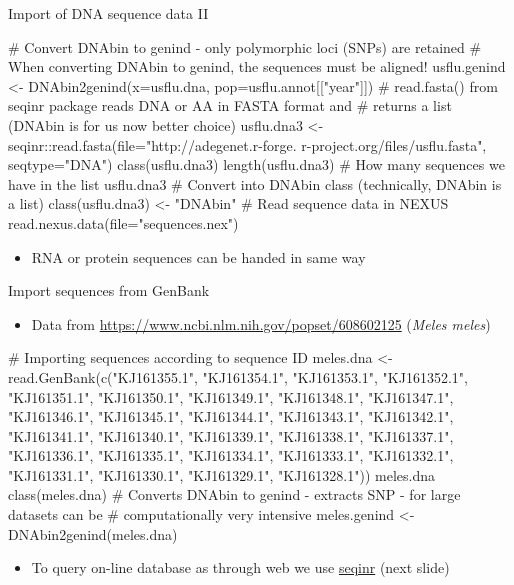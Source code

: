 \documentclass[compress, ucs, xelatex, 11pt, xcolor=svgnames,
  hyperref={
    bookmarks=true,
    unicode=true,
    colorlinks=true,
    pdftitle={Molecular data in R},
    plainpages=false,
    pdfauthor={Vojtech Zeisek},
    pdfsubject={Course about phylogeny and evolution in R},
    pdfcreator={XeLaTeX},
    pdfkeywords={R, evolution, phylogeny, molecular data},
    linkcolor=Tomato,
    anchorcolor=SaddleBrown,
    citecolor=Goldenrod,
    filecolor=DarkMagenta,
    menucolor=Sienna,
    urlcolor=DarkTurquoise,
    pdftex},
  url={hyphens, lowtilde} %
  ]{beamer}
\begin{document}
\begin{frame}[fragile]{Import of DNA sequence data II}
  \begin{spluscode}
    # Convert DNAbin to genind - only polymorphic loci (SNPs) are retained
    # When converting DNAbin to genind, the sequences must be aligned!
    usflu.genind <- DNAbin2genind(x=usflu.dna, pop=usflu.annot[["year"]])
    # read.fasta() from seqinr package reads DNA or AA in FASTA format and
    # returns a list (DNAbin is for us now better choice)
    usflu.dna3 <- seqinr::read.fasta(file="http://adegenet.r-forge.
      r-project.org/files/usflu.fasta", seqtype="DNA")
    class(usflu.dna3)
    length(usflu.dna3) # How many sequences we have in the list
    usflu.dna3
    # Convert into DNAbin class (technically, DNAbin is a list)
    class(usflu.dna3) <- "DNAbin"
    # Read sequence data in NEXUS
    read.nexus.data(file="sequences.nex")
  \end{spluscode}
  \begin{itemize}
    \item RNA or protein sequences can be handed in same way
  \end{itemize}
\end{frame}

\begin{frame}[fragile]{Import sequences from GenBank}
  \begin{itemize}
    \item Data from \url{https://www.ncbi.nlm.nih.gov/popset/608602125} (\textit{Meles meles})
  \end{itemize}
  \begin{spluscode}
    # Importing sequences according to sequence ID
    meles.dna <- read.GenBank(c("KJ161355.1", "KJ161354.1", "KJ161353.1",
      "KJ161352.1", "KJ161351.1", "KJ161350.1", "KJ161349.1", "KJ161348.1",
      "KJ161347.1", "KJ161346.1", "KJ161345.1", "KJ161344.1", "KJ161343.1",
      "KJ161342.1", "KJ161341.1", "KJ161340.1", "KJ161339.1", "KJ161338.1",
      "KJ161337.1", "KJ161336.1", "KJ161335.1", "KJ161334.1", "KJ161333.1",
      "KJ161332.1", "KJ161331.1", "KJ161330.1", "KJ161329.1", "KJ161328.1"))
    meles.dna
    class(meles.dna)
    # Converts DNAbin to genind - extracts SNP - for large datasets can be
    # computationally very intensive
    meles.genind <- DNAbin2genind(meles.dna)
  \end{spluscode}
  \begin{itemize}
    \item To query on-line database as through web we use \href{https://cran.r-project.org/web/packages/seqinr/index.html}{seqinr} (next slide)
  \end{itemize}
\end{frame}
\end{document}
